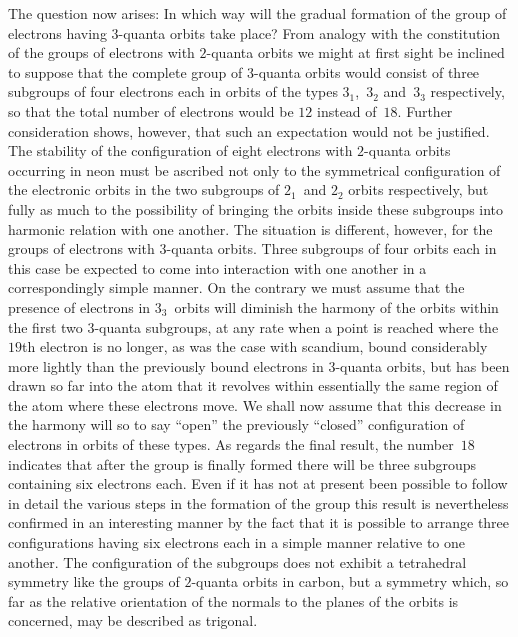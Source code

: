 The question now arises: In which way will the gradual formation
of the group of electrons having $3$-quanta orbits take place?
From analogy with the constitution of the groups of electrons with
$2$-quanta orbits we might at first sight be inclined to suppose that
the complete group of $3$-quanta orbits would consist of three subgroups
of four electrons each in orbits of the types $3_{1}$,~$3_{2}$ and~$3_{3}$
respectively, so that the total number of electrons would be $12$
instead of~$18$. Further consideration shows, however, that such an
expectation would not be justified. The stability of the configuration
of eight electrons with $2$-quanta orbits occurring in neon must
be ascribed not only to the symmetrical configuration of the electronic
orbits in the two subgroups of $2_{1}$~and $2_{2}$ orbits respectively,
but fully as much to the possibility of bringing the orbits inside these
subgroups into harmonic relation with one another. The situation
is different, however, for the groups of electrons with $3$-quanta
orbits. Three subgroups of four orbits each  in this case be
expected to come into interaction with one another in a correspondingly
simple manner. On the contrary we must assume that
the presence of electrons in $3_{3}$~orbits will diminish the harmony of
the orbits within the first two $3$-quanta subgroups, at any rate
when a point is reached where the $19$th electron is no longer, as
was the case with scandium, bound considerably more lightly than
the previously bound electrons in $3$-quanta orbits, but has been
drawn so far into the atom that it revolves within essentially
the same region of the atom where these electrons move. We
shall now assume that this decrease in the harmony will so to
say ``open'' the previously ``closed'' configuration of electrons
in orbits of these types. As regards the final result, the number~$18$
indicates that after the group is finally formed there will
be three subgroups containing six electrons each. Even if it has
not at present been possible to follow in detail the various
steps in the formation of the group this result is nevertheless
confirmed in an interesting manner by the fact that it is possible
to arrange three configurations having six electrons each in a simple
manner relative to one another. The configuration of the subgroups
does not exhibit a tetrahedral symmetry like the groups of $2$-quanta
orbits in carbon, but a symmetry which, so far as the relative
orientation of the normals to the planes of the orbits is concerned,
may be described as trigonal.

